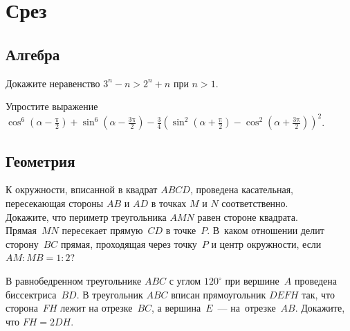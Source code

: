 
\section*{Срез}




\begingroup
    \ifx\mathup\undefined
        \def\piconst{\uppi}
    \else
        \def\piconst{\mathup{\pi}}

\subsection*{Алгебра}

\begin{problems}

\item
Докажите неравенство\enspace
$3^{n} - n > 2^{n} + n$\enspace
при $n > 1$.

\item
Упростите выражение
\\
\( \displaystyle
    \cos^6 \left( \alpha - \frac{  \piconst}{2} \right)
+
    \sin^6 \left( \alpha - \frac{3 \piconst}{2} \right)
-
    \frac{3}{4}
    \left(
        \sin^2 \left( \alpha + \frac{  \piconst}{2} \right)
        -
        \cos^2 \left( \alpha + \frac{3 \piconst}{2} \right)
    \right)^2
\).

\end{problems}

\subsection*{Геометрия}

\begin{problems}

\item
К окружности, вписанной в квадрат $ABCD$, проведена касательная, пересекающая
стороны $AB$ и $AD$ в точках $M$ и $N$ соответственно.
\\
\subproblem
Докажите, что периметр треугольника $AMN$ равен стороне квадрата.
\\
\subproblem
Прямая~$MN$ пересекает прямую~$CD$ в точке~$P$.
В~каком отношении делит сторону~$BC$ прямая, проходящая через точку~$P$
и центр окружности, если $AM : MB = 1 : 2$?

\item
В равнобедренном треугольнике $ABC$ с углом $120^\circ$ при вершине~$A$
проведена биссектриса~$BD$.
В треугольник $ABC$ вписан прямоугольник $DEFH$ так, что сторона~$FH$ лежит
на отрезке~$BC$, а вершина~$E$~--- на~отрезке~$AB$.
Докажите, что $FH = 2 DH$.

\end{problems}

